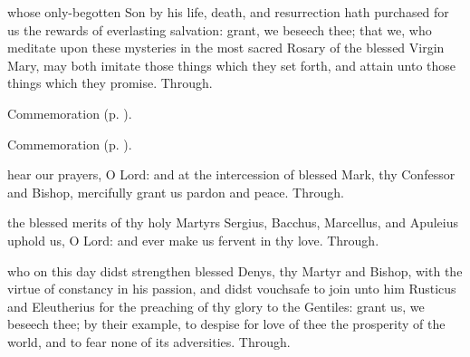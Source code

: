 \collect
{} whose only-begotten Son by his life, death, and resurrection hath purchased for us the rewards of everlasting salvation: grant, we beseech thee; that we, who meditate upon these mysteries in the most sacred Rosary of the blessed Virgin Mary, may both imitate those things which they set forth, and attain unto those things which they promise. Through.
\begin{rubric}
	Commemoration  (p. \pageref{MarkRomeCollect}).
\end{rubric}

\begin{rubric}
	Commemoration  (p. \pageref{SergiusCollect}).
\end{rubric}



\memorialCollect\label{MarkRomeCollect}
 hear our prayers, O Lord: and at the intercession of blessed Mark, thy Confessor and Bishop, mercifully grant us pardon and peace. Through.



\memorialCollect\label{SergiusCollect}
 the blessed merits of thy holy Martyrs Sergius, Bacchus, Marcellus, and Apuleius uphold us, O Lord: and ever make us fervent in thy love. Through.



\memorialCollect
{} who on this day didst strengthen blessed Denys, thy Martyr and Bishop, with the virtue of constancy in his passion, and didst vouchsafe to join unto him Rusticus and Eleutherius for the preaching of thy glory to the Gentiles: grant us, we beseech thee; by their example, to despise for love of thee the prosperity of the world, and to fear none of its adversities. Through.


\clearpage
{}

